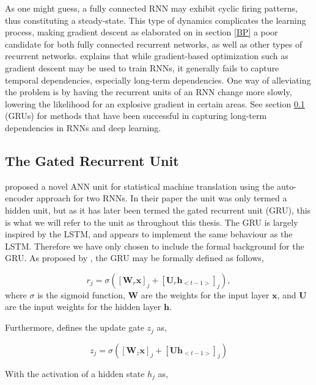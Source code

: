 As one might guess, a fully connected RNN may exhibit cyclic firing patterns, thus constituting a steady-state. This type of dynamics complicates the learning process, making gradient descent as elaborated on in section \ref{BP} a poor candidate for both fully connected recurrent networks, as well as other types of recurrent networks. \cite{Bengio2013b} explains that while gradient-based optimization such as gradient descent may be used to train RNNs, it generally fails to capture temporal dependencies, especially long-term dependencies. One way of alleviating the problem is by having the recurrent units of an RNN change more slowly, lowering the likelihood for an explosive gradient in certain areas. See section \ref{GRU} (GRUs) for methods that have been successful in capturing long-term dependencies in RNNs and deep learning.

\subsection{The Gated Recurrent Unit}\label{GRU}

\cite{Cho2014} proposed a novel ANN unit for statistical machine translation using the auto-encoder approach for two RNNs. In their paper the unit was only termed a hidden unit, but as it has later been termed the gated recurrent unit (GRU), this is what we will refer to the unit as throughout this thesis. The GRU is largely inspired by the LSTM, and appears to implement the same behaviour as the LSTM. Therefore we have only chosen to include the formal background for the GRU. As proposed by \cite{Cho2014}, the GRU may be formally defined as follows,

\begin{equation}
    r_j = \sigma ([\textbf{W}_r \textbf{x}]_j + [\textbf{U}_r\textbf{h}_{<t-1>}]_j), 
\end{equation}
where $\sigma$ is the sigmoid function, $\textbf{W}$ are the weights for the input layer $\textbf{x}$, and $\textbf{U}$ are the input weights for the hidden layer $\textbf{h}$.

Furthermore, \cite{Cho2014} defines the update gate $z_j$ as,

\begin{equation}
    z_j = \sigma([\textbf{W}_z\textbf{x}]_j + [\textbf{U}\textbf{h}_{<t-1>}]_j)
\end{equation}
 
With the activation of a hidden state $h_j$ as,
 
